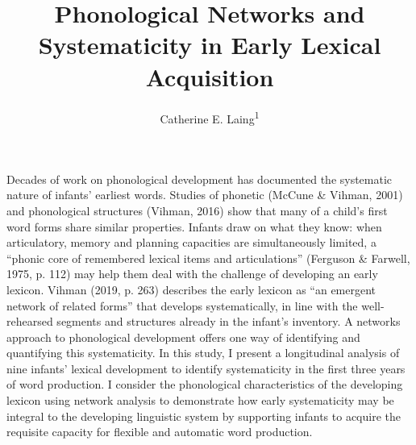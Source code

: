 \documentclass[
  man,mask,floatsintext]{apa6}
\title{Phonological Networks and Systematicity in Early Lexical Acquisition}
\author{Catherine E. Laing\textsuperscript{1}}
\date{}
\affiliation{\vspace{0.5cm}\textsuperscript{1} University of York, York, UK}
\begin{document}
\maketitle

Decades of work on phonological development has documented the systematic nature of infants' earliest words. Studies of phonetic (McCune \& Vihman, 2001) and phonological structures (Vihman, 2016) show that many of a child's first word forms share similar properties. Infants draw on what they know: when articulatory, memory and planning capacities are simultaneously limited, a ``phonic core of remembered lexical items and articulations'' (Ferguson \& Farwell, 1975, p. 112) may help them deal with the challenge of developing an early lexicon. Vihman (2019, p. 263) describes the early lexicon as ``an emergent network of related forms'' that develops systematically, in line with the well-rehearsed segments and structures already in the infant's inventory. A networks approach to phonological development offers one way of identifying and quantifying this systematicity. In this study, I present a longitudinal analysis of nine infants' lexical development to identify systematicity in the first three years of word production. I consider the phonological characteristics of the developing lexicon using network analysis to demonstrate how early systematicity may be integral to the developing linguistic system by supporting infants to acquire the requisite capacity for flexible and automatic word production.
\end{document}
